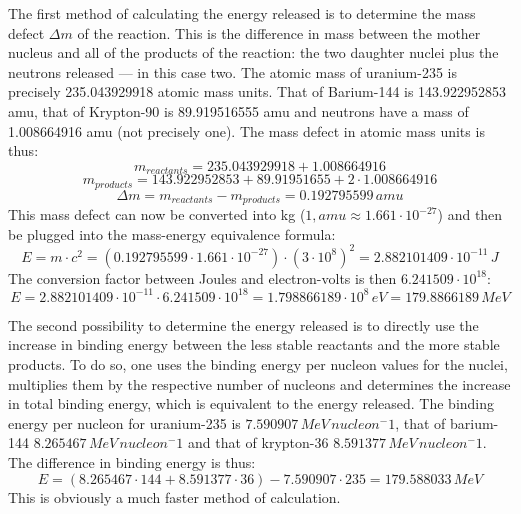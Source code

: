 \begin{enumerate}
	

	The first method of calculating the energy released is to determine the mass defect $\Delta m$ of the reaction. This is the difference in mass between the mother nucleus and all of the products of the reaction: the two daughter nuclei plus the neutrons released --- in this case two. The atomic mass of uranium-235 is precisely 235.043929918 atomic mass units. That of Barium-144 is 143.922952853 amu, that of Krypton-90 is 89.919516555 amu and neutrons have a mass of 1.008664916 amu (not precisely one). The mass defect in atomic mass units is thus: $$m_{reactants} = 235.043929918 + 1.008664916$$ $$m_{products} = 143.922952853 + 89.91951655 + 2 \cdot 1.008664916$$ $$\Delta m = m_{reactants} - m_{products} = 0.192795599\, amu$$ This mass defect can now be converted into kg ($1, amu \approx 1.661 \cdot 10^{-27}$) and then be plugged into the mass-energy equivalence formula: $$E = m \cdot c^2 = (0.192795599 \cdot 1.661 \cdot 10^{-27}) \cdot (3 \cdot 10^8)^2 = 2.882101409 \cdot 10^{-11}\, J$$ The conversion factor between Joules and electron-volts is then $6.241509 \cdot 10^{18}$: $$E = 2.882101409 \cdot 10^{-11} \cdot 6.241509 \cdot 10^{18} = 1.798866189 \cdot 10^8\, eV = 179.8866189\, MeV$$


	The second possibility to determine the energy released is to directly use the increase in binding energy between the less stable reactants and the more stable products. To do so, one uses the binding energy per nucleon values for the nuclei, multiplies them by the respective number of nucleons and determines the increase in total binding energy, which is equivalent to the energy released. The binding energy per nucleon for uranium-235 is $7.590907\, MeV\, nucleon^-1$, that of barium-144 $8.265467\, MeV\, nucleon^-1$ and that of krypton-36 $8.591377\, MeV\, nucleon^-1$. The difference in binding energy is thus: $$E = (8.265467 \cdot 144 + 8.591377 \cdot 36) - 7.590907 \cdot 235 = 179.588033\, MeV$$ This is obviously a much faster method of calculation.

\end{enumerate}


